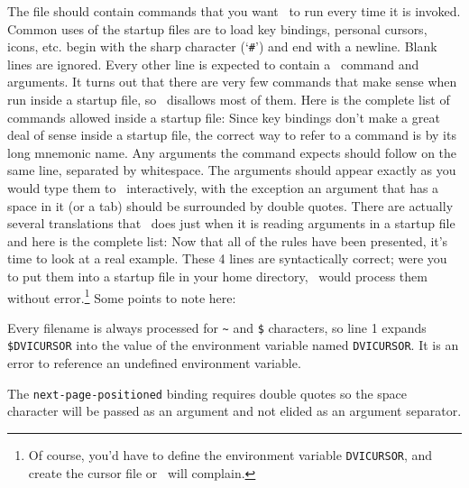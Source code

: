 The file should contain commands that you want \dtl\ to run
every time it is invoked.  Common uses of the startup files are to load
key bindings, personal cursors, icons, etc.   begin with
the sharp character (`{\tt \#}') and end with a newline.  Blank lines
are ignored.  Every other line is expected to contain a \dtl\ command
and arguments.  It turns out that there are very few commands that make
sense when run inside a startup file, so \dtl\ disallows most of them.
Here is the complete list of commands allowed inside a startup file:
\medskip
{}
\medskip
Since key bindings don't make a great deal of sense inside a startup
file, the correct way to refer to a command is by its long mnemonic
name.  Any arguments the command expects should follow on the same
line, separated by whitespace.  
The arguments should appear exactly as you would type them to \dtl\
interactively, with the exception an argument that has a space
in it (or a tab) should be surrounded by double quotes.
There are actually several translations that \dtl\ does just
when it is reading arguments in a startup file and here is the complete
list:
\medskip
{}
\medskip\noindent
Now that all of the rules have been presented, it's time to look at a
real example.  These 4 lines are syntactically correct; were you to
put them into a startup file in your home directory, \dtl\ would
process them without error.\footnote*{Of course, you'd have to define
the environment variable {\tt DVICURSOR}, and create the cursor file or
\dtl\ will complain.}
\medskip
{}
\medskip
\noindent Some points to note here:
\item Every filename is always processed for {\tt \~} and
{\tt \$} characters, so line
1 expands {\tt \$DVICURSOR} into the value of the environment variable
named {\tt DVICURSOR}.
It is an error to reference an undefined environment variable.
\item The {\tt next-page-positioned} binding requires double quotes so
the space character will be passed as an argument and not elided as an
argument separator.

